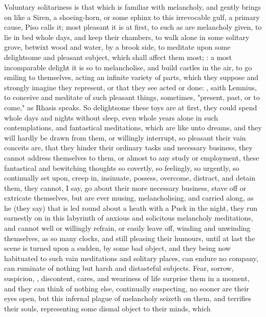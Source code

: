 Voluntary solitariness is that which is familiar with melancholy, and gently
brings on like a Siren, a shoeing-horn, or some sphinx to this irrevocable
gulf, a primary cause, Piso calls it; most pleasant it is
at first, to such as are melancholy given, to lie in bed whole days, and keep
their chambers, to walk alone in some solitary grove, betwixt wood and water,
by a brook side, to meditate upon some delightsome and pleasant subject, which
shall affect them most; : a
most incomparable delight it is so to melancholise, and build castles in the
air, to go smiling to themselves, acting an infinite variety of parts, which
they suppose and strongly imagine they represent, or that they see acted or
done: , saith Lemnius, to conceive and meditate of
such pleasant things, sometimes, "present, past, or to
come," as Rhasis speaks. So delightsome these toys are at first, they could
spend whole days and nights without sleep, even whole years alone in such
contemplations, and fantastical meditations, which are like unto dreams, and
they will hardly be drawn from them, or willingly interrupt, so pleasant their
vain conceits are, that they hinder their ordinary tasks and necessary
business, they cannot address themselves to them, or almost to any study or
employment, these fantastical and bewitching thoughts so covertly, so
feelingly, so urgently, so continually set upon, creep in, insinuate, possess,
overcome, distract, and detain them, they cannot, I say, go about their more
necessary business, stave off or extricate themselves, but are ever musing,
melancholising, and carried along, as he (they say) that is led round about a
heath with a Puck in the night, they run earnestly on in this labyrinth of
anxious and solicitous melancholy meditations, and cannot well or willingly
refrain, or easily leave off, winding and unwinding themselves, as so many
clocks, and still pleasing their humours, until at last the scene is turned
upon a sudden, by some bad object, and they being now habituated to such vain
meditations and solitary places, can endure no company, can ruminate of nothing
but harsh and distasteful subjects. Fear, sorrow, suspicion, , discontent, cares, and weariness of life surprise them in a moment, and
they can think of nothing else, continually suspecting, no sooner are their
eyes open, but this infernal plague of melancholy seizeth on them, and
terrifies their souls, representing some dismal object to their minds, which
